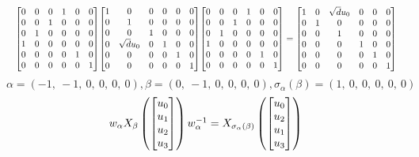 \documentclass[11pt]{article}
\theoremstyle{definition}
\begin{document}
\[
\scaletoalign{\textwidth}{{\left[\begin{matrix}0 & 0 & 0 & 1 & 0 & 0\\0 & 0 & 1 & 0 & 0 & 0\\0 & 1 & 0 & 0 & 0 & 0\\1 & 0 & 0 & 0 & 0 & 0\\0 & 0 & 0 & 0 & 1 & 0\\0 & 0 & 0 & 0 & 0 & 1\end{matrix}\right]} {\left[\begin{matrix}1 & 0 & 0 & 0 & 0 & 0\\0 & 1 & 0 & 0 & 0 & 0\\0 & 0 & 1 & 0 & 0 & 0\\0 & \sqrt{d} u_{0} & 0 & 1 & 0 & 0\\0 & 0 & 0 & 0 & 1 & 0\\0 & 0 & 0 & 0 & 0 & 1\end{matrix}\right]} {\left[\begin{matrix}0 & 0 & 0 & 1 & 0 & 0\\0 & 0 & 1 & 0 & 0 & 0\\0 & 1 & 0 & 0 & 0 & 0\\1 & 0 & 0 & 0 & 0 & 0\\0 & 0 & 0 & 0 & 1 & 0\\0 & 0 & 0 & 0 & 0 & 1\end{matrix}\right]} = {\left[\begin{matrix}1 & 0 & \sqrt{d} u_{0} & 0 & 0 & 0\\0 & 1 & 0 & 0 & 0 & 0\\0 & 0 & 1 & 0 & 0 & 0\\0 & 0 & 0 & 1 & 0 & 0\\0 & 0 & 0 & 0 & 1 & 0\\0 & 0 & 0 & 0 & 0 & 1\end{matrix}\right]}}
\]
\[
\alpha = \left( -1, \  -1, \  0, \  0, \  0, \  0\right), \beta = \left( 0, \  -1, \  0, \  0, \  0, \  0\right), \sigma_{\alpha}(\beta) = \left( 1, \  0, \  0, \  0, \  0, \  0\right)
\]
\[
\scaletoalign{\textwidth}{w_{\alpha} X_{\beta}\left(\left[\begin{matrix}u_{0}\\u_{1}\\u_{2}\\u_{3}\end{matrix}\right]\right) w_{\alpha}^{-1} = X_{\sigma_{\alpha}\left(\beta\right)}\left(\left[\begin{matrix}u_{0}\\u_{2}\\u_{1}\\u_{3}\end{matrix}\right]\right)}
\]
\end{document}
